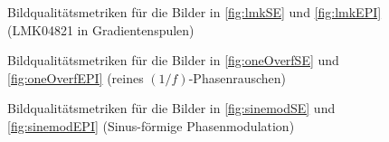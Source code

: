 \begin{figure}[H]
	\centering
	\hfill
	\caption[Bildqualitätsmetriken LMK04821]{Bildqualitätsmetriken für die Bilder in \autoref{fig:lmkSE} und \autoref{fig:lmkEPI} (LMK04821 in Gradientenspulen)}
	\label{fig:metrikenLMK}	
\end{figure}

\begin{figure}[H]
	\centering
	\hfill
	\caption[Bildqualitätsmetriken ($1/f$)-Phasenrauschen]{Bildqualitätsmetriken für die Bilder in \autoref{fig:oneOverfSE} und \autoref{fig:oneOverfEPI} (reines $(1/f)$-Phasenrauschen)}
	\label{fig:metrikenOneOverf}	
\end{figure}

\begin{figure}[H]
	\centering
	\hfill
	\caption[Bildqualitätsmetriken Phasenmodulation]{Bildqualitätsmetriken für die Bilder in \autoref{fig:sinemodSE} und \autoref{fig:sinemodEPI} (Sinus-förmige Phasenmodulation)}
	\label{fig:metrikenSine}	
\end{figure}


















